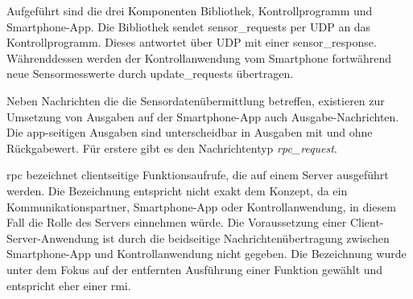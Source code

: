 \documentclass[11pt,a4paper]{report}
\begin{document}
Aufgeführt sind die drei Komponenten Bibliothek, Kontrollprogramm und Smartphone-App.
Die Bibliothek sendet sensor\_requests per UDP an das Kontrollprogramm.
Dieses antwortet über UDP mit einer sensor\_response.
Währenddessen werden der Kontrollanwendung vom Smartphone fortwährend neue Sensormesswerte durch update\_requests übertragen.

Neben Nachrichten die die Sensordatenübermittlung betreffen, existieren zur Umsetzung von Ausgaben auf der Smartphone-App auch Ausgabe-Nachrichten.
Die app-seitigen Ausgaben sind unterscheidbar in Ausgaben mit und ohne Rückgabewert.
Für erstere gibt es den Nachrichtentyp \textit{rpc\_request}.

\acrfull{rpc} bezeichnet clientseitige Funktionsaufrufe, die auf einem Server ausgeführt werden.
Die Bezeichnung entspricht nicht exakt dem Konzept, da ein Kommunikationspartner, Smartphone-App oder Kontrollanwendung, in diesem Fall die Rolle des Servers einnehmen würde.
Die Voraussetzung einer Client-Server-Anwendung ist durch die beidseitige Nachrichtenübertragung zwischen Smartphone-App und Kontrollanwendung nicht gegeben.
Die Bezeichnung wurde unter dem Fokus auf der entfernten Ausführung einer Funktion gewählt und entspricht eher einer \acrfull{rmi}.
\end{document}
